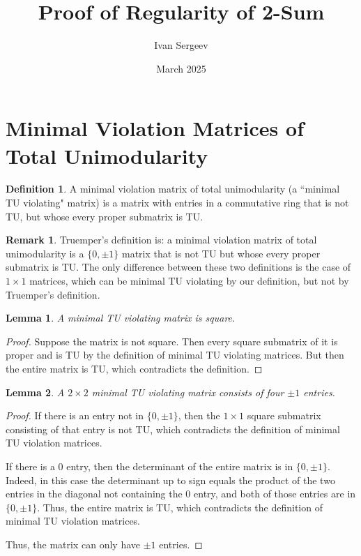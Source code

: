\documentclass{article}
\title{Proof of Regularity of 2-Sum}
\author{Ivan Sergeev}
\date{March 2025}
\newtheorem{lemma}{Lemma}
\theoremstyle{definition}
\newtheorem{definition}{Definition}
\newtheorem{remark}{Remark}
\begin{document}
\maketitle

\section{Minimal Violation Matrices of Total Unimodularity}

\begin{definition}
    A minimal violation matrix of total unimodularity (a ``minimal TU violating" matrix) is a matrix with entries in a commutative ring that is not TU, but whose every proper submatrix is TU.
\end{definition}

\begin{remark}
    Truemper's definition is: a minimal violation matrix of total unimodularity is a $\{0, \pm 1\}$ matrix that is not TU but whose every proper submatrix is TU. The only difference between these two definitions is the case of $1 \times 1$ matrices, which can be minimal TU violating by our definition, but not by Truemper's definition.
\end{remark}

\begin{lemma}
    A minimal TU violating matrix is square.
\end{lemma}

\begin{proof}
    Suppose the matrix is not square. Then every square submatrix of it is proper and is TU by the definition of minimal TU violating matrices. But then the entire matrix is TU, which contradicts the definition.
\end{proof}

\begin{lemma}
    A $2 \times 2$ minimal TU violating matrix consists of four $\pm 1$ entries.
\end{lemma}

\begin{proof}
    If there is an entry not in $\{0, \pm 1\}$, then the $1 \times 1$ square submatrix consisting of that entry is not TU, which contradicts the definition of minimal TU violation matrices.

    If there is a $0$ entry, then the determinant of the entire matrix is in $\{0, \pm 1\}$. Indeed, in this case the determinant up to sign equals the product of the two entries in the diagonal not containing the $0$ entry, and both of those entries are in $\{0, \pm 1\}$. Thus, the entire matrix is TU, which contradicts the definition of minimal TU violation matrices.

    Thus, the matrix can only have $\pm 1$ entries.
\end{proof}
\end{document}
